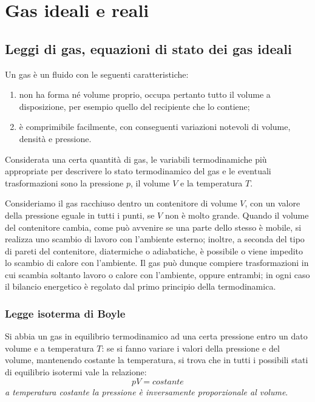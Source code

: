 \documentclass[class=book, crop=false, oneside, 12pt]{standalone}
\begin{document}
\chapter{Gas ideali e reali}

\section{Leggi di gas, equazioni di stato dei gas ideali}

Un gas è un fluido con le seguenti caratteristiche:
\begin{enumerate}
    \item non ha forma né volume proprio, occupa pertanto tutto il volume a disposizione, per esempio quello del recipiente che lo contiene; 
    \item è comprimibile facilmente, con conseguenti variazioni notevoli di volume, densità e pressione.
\end{enumerate}

Considerata una certa quantità di gas, le variabili termodinamiche più appropriate per descrivere lo stato termodinamico del gas e le eventuali trasformazioni sono la pressione \(p\), il volume \(V\) e la temperatura \(T\).

Consideriamo il gas racchiuso dentro un contenitore di volume \(V\), con un valore della pressione eguale in tutti i punti, se \(V\) non è molto grande. 
Quando il volume del contenitore cambia, come può avvenire se una parte dello stesso è mobile, si realizza uno scambio di lavoro con l'ambiente esterno; inoltre, a seconda del tipo di pareti del contenitore, diatermiche o adiabatiche, è possibile o viene impedito lo scambio di calore con l'ambiente. 
Il gas può dunque compiere trasformazioni in cui scambia soltanto lavoro o calore con l'ambiente, oppure entrambi; in ogni caso il bilancio energetico è regolato dal primo principio della termodinamica.

\subsection{Legge isoterma di Boyle}

Si abbia un gas in equilibrio termodinamico ad una certa pressione entro un dato volume e a temperatura \(T\): se si fanno variare i valori della pressione e del volume, mantenendo costante la temperatura, si trova che in tutti i possibili stati di equilibrio isotermi vale la relazione:
\begin{equation}
    pV = costante
\end{equation}
\emph{a temperatura costante la pressione è inversamente proporzionale al volume}.
\end{document}
